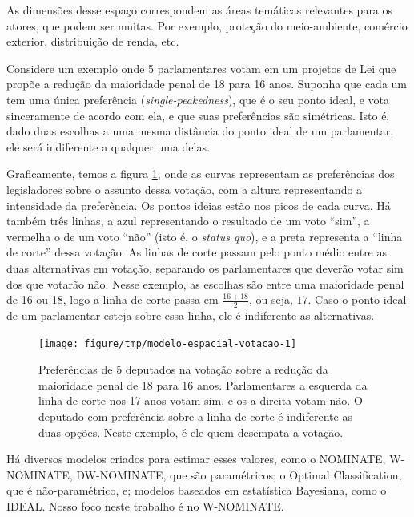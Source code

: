 \documentclass[a4paper,titlepage]{ppgi}\usepackage[]{graphicx}\usepackage[]{color}
\newenvironment{knitrout}{}{} %
\begin{document}
As dimensões desse espaço correspondem as áreas temáticas relevantes para os
atores, que podem ser muitas. Por exemplo, proteção do meio-ambiente, comércio
exterior, distribuição de renda, etc.

Considere um exemplo onde 5 parlamentares votam em um
projetos de Lei que propõe a redução da maioridade penal de
18 para 16 anos. Suponha
que cada um tem uma única preferência (\emph{single-peakedness}), que é o seu
ponto ideal, e vota sinceramente de acordo com ela, e que suas preferências são
simétricas. Isto é, dado duas escolhas a uma mesma distância do ponto ideal de
um parlamentar, ele será indiferente a qualquer uma delas.

Graficamente, temos a figura \ref{fig:modelo-espacial-votacao}, onde as curvas
representam as preferências dos legisladores sobre o assunto dessa votação, com
a altura representando a intensidade da preferência. Os pontos ideias estão nos
picos de cada curva. Há também três linhas, a azul representando o resultado de
um voto ``sim'', a vermelha o de um voto ``não'' (isto é, o \emph{status quo}),
e a preta representa a ``linha de corte'' dessa votação. As linhas de corte
passam pelo ponto médio entre as duas alternativas em votação, separando os
parlamentares que deverão votar sim dos que votarão não. Nesse exemplo, as
escolhas são entre uma maioridade penal de 16 ou
18, logo a linha de corte passa em $\frac{16 +
18}{2}$, ou seja, $17$. Caso o ponto ideal de um parlamentar esteja sobre essa
linha, ele é indiferente as alternativas.

\begin{knitrout}
\color{fgcolor}\begin{figure}
\texttt{[image: figure/tmp/modelo-espacial-votacao-1]} \caption[Preferências de 5 deputados na votação sobre a redução da maioridade penal de 18 para 16 anos]{Preferências de 5 deputados na votação sobre a redução da maioridade penal de 18 para 16 anos.  Parlamentares a esquerda da linha de corte nos 17 anos votam sim, e os a direita votam não. O deputado com preferência sobre a linha de corte é indiferente as duas opções. Neste exemplo, é ele quem desempata a votação.}\label{fig:modelo-espacial-votacao}
\end{figure}


\end{knitrout}

Há diversos modelos criados para estimar esses valores, como o NOMINATE,
W-NOMINATE, DW-NOMINATE, que são paramétricos; o Optimal Classification, que é
não-paramétrico, e; modelos baseados em estatística Bayesiana, como o IDEAL.
Nosso foco neste trabalho é no W-NOMINATE.
\cite{Poole2000,Poole2005,Poole2014,Jackman2000,Clinton2004}
\end{document}
